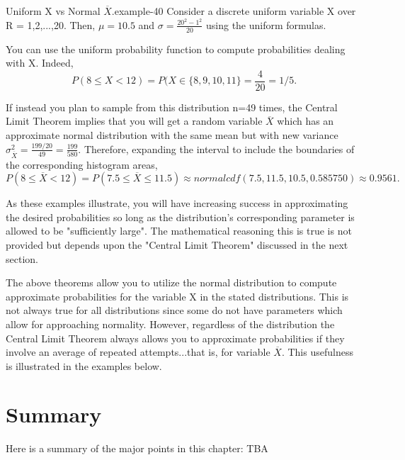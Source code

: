 \documentclass[10pt,]{book}
\numberwithin{equation}{section}
\newcommand{\lt}{<}
\begin{document}
\begin{example}{Uniform X vs Normal \(\overline{X}\).}{example-40}%
\hypertarget{p-1083}{}%
Consider a discrete uniform variable X over R = {1,2,...,20}.  Then, \(\mu = 10.5\) and \(\sigma = \frac{20^2-1^2}{20}\) using the uniform formulas.%
\par
\hypertarget{p-1084}{}%
You can use the uniform probability function to compute probabilities dealing with X. Indeed,%
\begin{equation*}
P(8 \le X \lt 12) = P(X \in \{8,9,10,11 \} = \frac{4}{20} = 1/5.
\end{equation*}
%
\par
\hypertarget{p-1085}{}%
If instead you plan to sample from this distribution n=49 times, the Central Limit Theorem implies that you will get a random variable \(\overline{X}\) which has an approximate normal distribution with the same mean but with new variance \(\sigma_{\overline{X}}^2 = \frac{199/20}{49} = \frac{199}{580}\).  Therefore, expanding the interval to include the boundaries of the corresponding histogram areas,%
\begin{equation*}
P( 8 \le \overline{X} \lt 12 ) = P(7.5 \le \overline{X} \le 11.5) \approx normalcdf(7.5,11.5,10.5,0.585750) \approx 0.9561 .
\end{equation*}
%
\end{example}
\hypertarget{p-1086}{}%
As these examples illustrate, you will have increasing success in approximating the desired probabilities so long as the distribution's corresponding parameter is allowed to be "sufficiently large". The mathematical reasoning this is true is not provided but depends upon the "Central Limit Theorem" discussed in the next section.%
\par
\hypertarget{p-1087}{}%
The above theorems allow you to utilize the normal distribution to compute approximate probabilities for the variable X in the stated distributions. This is not always true for all distributions since some do not have parameters which allow for approaching normality. However, regardless of the distribution the Central Limit Theorem always allows you to approximate probabilities if they involve an average of repeated attempts...that is, for variable \(\overline{X}\). This usefulness is illustrated in the examples below.%
%
%
\typeout{************************************************}
\typeout{************************************************}
%
\section[{Summary}]{Summary}\label{section-63}
\hypertarget{p-1088}{}%
Here is a summary of the major points in this chapter:%
\hypertarget{p-1089}{}%
TBA%
%
%
\typeout{************************************************}
\typeout{************************************************}
%
\end{document}
